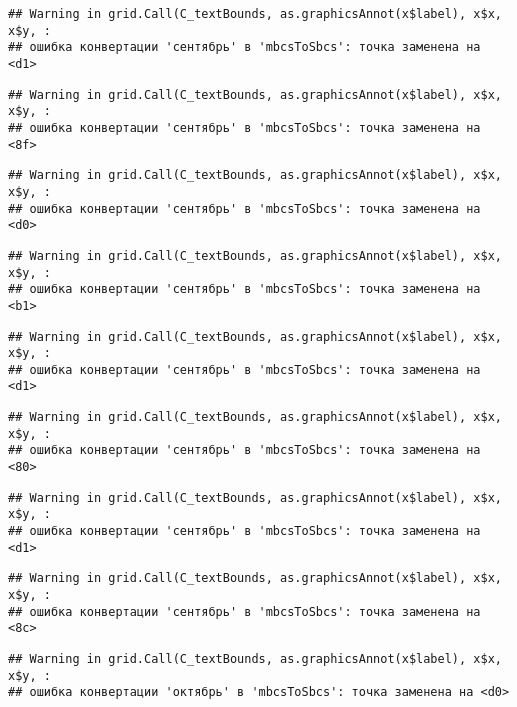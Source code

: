 \documentclass[
]{article}
\begin{document}
\begin{verbatim}
## Warning in grid.Call(C_textBounds, as.graphicsAnnot(x$label), x$x, x$y, :
## ошибка конвертации 'сентябрь' в 'mbcsToSbcs': точка заменена на <d1>
\end{verbatim}

\begin{verbatim}
## Warning in grid.Call(C_textBounds, as.graphicsAnnot(x$label), x$x, x$y, :
## ошибка конвертации 'сентябрь' в 'mbcsToSbcs': точка заменена на <8f>
\end{verbatim}

\begin{verbatim}
## Warning in grid.Call(C_textBounds, as.graphicsAnnot(x$label), x$x, x$y, :
## ошибка конвертации 'сентябрь' в 'mbcsToSbcs': точка заменена на <d0>
\end{verbatim}

\begin{verbatim}
## Warning in grid.Call(C_textBounds, as.graphicsAnnot(x$label), x$x, x$y, :
## ошибка конвертации 'сентябрь' в 'mbcsToSbcs': точка заменена на <b1>
\end{verbatim}

\begin{verbatim}
## Warning in grid.Call(C_textBounds, as.graphicsAnnot(x$label), x$x, x$y, :
## ошибка конвертации 'сентябрь' в 'mbcsToSbcs': точка заменена на <d1>
\end{verbatim}

\begin{verbatim}
## Warning in grid.Call(C_textBounds, as.graphicsAnnot(x$label), x$x, x$y, :
## ошибка конвертации 'сентябрь' в 'mbcsToSbcs': точка заменена на <80>
\end{verbatim}

\begin{verbatim}
## Warning in grid.Call(C_textBounds, as.graphicsAnnot(x$label), x$x, x$y, :
## ошибка конвертации 'сентябрь' в 'mbcsToSbcs': точка заменена на <d1>
\end{verbatim}

\begin{verbatim}
## Warning in grid.Call(C_textBounds, as.graphicsAnnot(x$label), x$x, x$y, :
## ошибка конвертации 'сентябрь' в 'mbcsToSbcs': точка заменена на <8c>
\end{verbatim}

\begin{verbatim}
## Warning in grid.Call(C_textBounds, as.graphicsAnnot(x$label), x$x, x$y, :
## ошибка конвертации 'октябрь' в 'mbcsToSbcs': точка заменена на <d0>
\end{verbatim}
\end{document}
